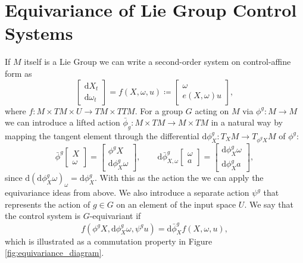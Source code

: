 \section{Equivariance of Lie Group Control Systems}

If $M$ itself is a Lie Group we can write a second-order system on control-affine form as
\begin{equation}
\label{eq:lie_control_system}
  \begin{bmatrix} \mathrm{d} X_t \\ \mathrm{d} \omega_t \end{bmatrix} =  f\left( X, \omega, u \right) \coloneq \begin{bmatrix} \omega \\ e(X, \omega)u \end{bmatrix},
\end{equation}
where $f : M \times TM \times U \rightarrow TM \times TTM$. For a group $G$ acting on $M$ via $\phi^g : M \rightarrow M$ we can introduce a lifted action $\bar \phi_g : M \times TM \rightarrow M \times TM$ in a natural way by mapping the tangent element through the differential $\mathrm{d} \phi^g_X : T_X M \rightarrow T_{\phi^g X} M$ of $\phi^g$:
\begin{equation}
  \bar \phi^g \begin{bmatrix}
    X \\ \omega
  \end{bmatrix} = \begin{bmatrix} \phi^g X \\ \mathrm{d} \phi^g_X \omega \end{bmatrix}, \qquad \mathrm{d} \bar \phi^g_{X, \omega} \begin{bmatrix}
    \omega \\ a
  \end{bmatrix} = \begin{bmatrix} \mathrm{d} \phi^g_X \omega \\ \mathrm{d} \phi^g_X a \end{bmatrix},
\end{equation}
since $\mathrm{d} (\mathrm{d} \phi^g_X \omega)_\omega = \mathrm{d} \phi^g_X$. With this as the action the we can apply the equivariance ideas from above. We also introduce a separate action $\psi^g$ that represents the action of $g \in G$ on an element of the input space $U$. We say that the control system is $G$-equivariant if
\begin{equation}
  \label{eq:controlled_equivariance}
  f \left( \phi^g X, \mathrm{d} \phi^g_X \omega, \psi^g u \right) = \mathrm{d} \bar \phi_X^g f(X, \omega, u),
\end{equation}
which is illustrated as a commutation property in Figure \ref{fig:equivariance_diagram}.

